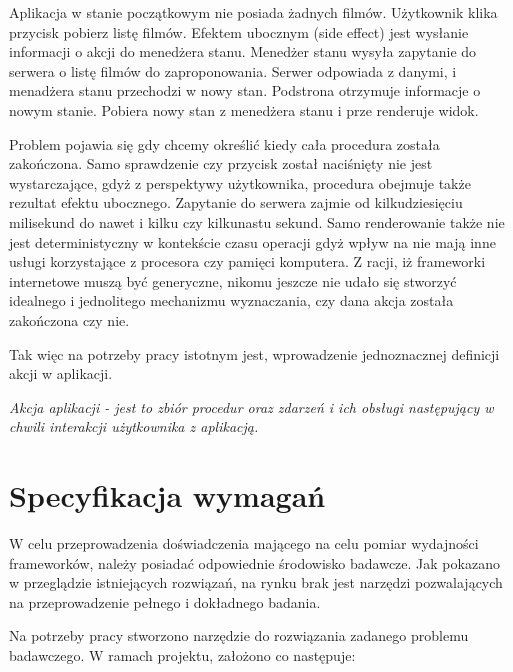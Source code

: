 Aplikacja w stanie początkowym nie posiada żadnych filmów. Użytkownik klika przycisk pobierz listę filmów. Efektem ubocznym (side effect)  jest wysłanie informacji o akcji do menedżera stanu.
Menedżer stanu wysyła zapytanie do serwera o listę filmów do zaproponowania. Serwer odpowiada z danymi, i menadżera stanu przechodzi w nowy stan.
Podstrona otrzymuje informacje o nowym stanie. Pobiera nowy stan z menedżera stanu i prze renderuje widok.

Problem pojawia się gdy chcemy określić kiedy cała procedura została zakończona.
Samo sprawdzenie czy przycisk został naciśnięty nie jest wystarczające, gdyż z perspektywy użytkownika, procedura obejmuje także rezultat efektu ubocznego.
Zapytanie do serwera zajmie od kilkudziesięciu milisekund do nawet i kilku czy kilkunastu sekund.
Samo renderowanie także nie jest deterministyczny w kontekście czasu operacji gdyż wpływ na nie mają inne usługi korzystające z procesora czy pamięci komputera.
Z racji, iż frameworki internetowe muszą być generyczne, nikomu jeszcze nie udało się stworzyć idealnego i jednolitego mechanizmu wyznaczania, czy dana akcja została zakończona czy nie.

Tak więc na potrzeby pracy istotnym jest, wprowadzenie jednoznacznej definicji akcji w aplikacji.

\emph{Akcja aplikacji - jest to zbiór procedur oraz zdarzeń i ich obsługi następujący w chwili interakcji użytkownika z aplikacją.}



\section{Specyfikacja wymagań}

W celu przeprowadzenia doświadczenia mającego na celu pomiar wydajności frameworków, należy posiadać odpowiednie środowisko badawcze.
Jak pokazano w przeglądzie istniejących rozwiązań, na rynku brak jest narzędzi pozwalających na przeprowadzenie pełnego i dokładnego badania.

Na potrzeby pracy stworzono narzędzie do rozwiązania zadanego problemu badawczego. W ramach projektu, założono co następuje:

